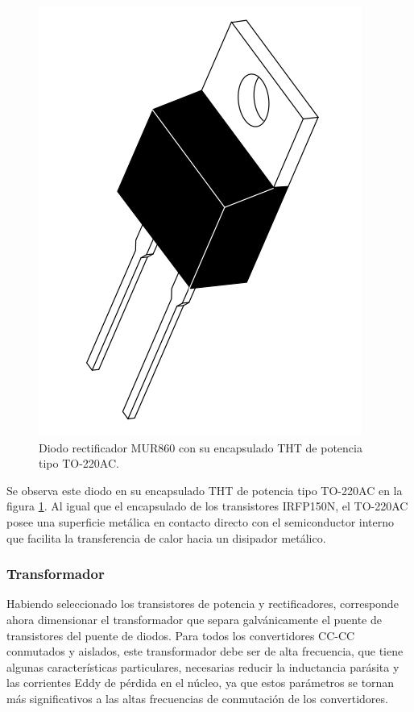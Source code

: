\begin{figure}[h]
    \centering
    \includegraphics[scale=0.16]{Imagenes/MUR860.png}
    \caption{Diodo rectificador MUR860 con su encapsulado THT de potencia tipo TO-220AC.}
    \label{mur860}
\end{figure}

Se observa este diodo en su encapsulado THT de potencia tipo TO-220AC en la figura \ref{mur860}. Al igual que el encapsulado de los transistores IRFP150N, el TO-220AC posee una superficie metálica en contacto directo con el semiconductor interno que facilita la transferencia de calor hacia un disipador metálico.\\

\subsubsection{Transformador}

Habiendo seleccionado los transistores de potencia y rectificadores, corresponde ahora dimensionar el transformador que separa galvánicamente el puente de transistores del puente de diodos. Para todos los convertidores CC-CC conmutados y aislados, este transformador debe ser de alta frecuencia, que tiene algunas características particulares, necesarias reducir la inductancia parásita y las corrientes Eddy de pérdida en el núcleo, ya que estos parámetros se tornan más significativos a las altas frecuencias de conmutación de los convertidores.\\

